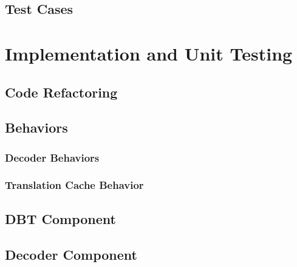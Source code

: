\documentclass[12pt]{article}
\newcounter{subsubsubsection}[subsubsection]
\begin{document}
\subsection{Test Cases}


\newpage
\section{Implementation and Unit Testing}


\subsection{Code Refactoring}


\subsection{Behaviors}
\subsubsection{Decoder Behaviors}


\subsubsection{Translation Cache Behavior}
					





\subsection {DBT Component}

\subsection{Decoder Component}


\newpage
\end{document}
